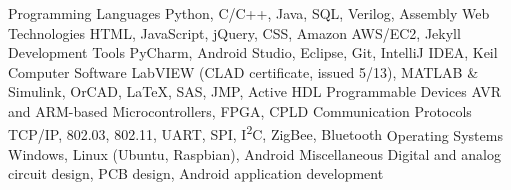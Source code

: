 \begin{cvskills}
  \cvskill
    {Programming Languages}
    {Python, C/C++, Java, SQL, Verilog, Assembly}
  \cvskill
    {Web Technologies}
    {HTML, JavaScript, jQuery, CSS, Amazon AWS/EC2, Jekyll}
  \cvskill
    {Development Tools}
    {PyCharm, Android Studio, Eclipse, Git, IntelliJ IDEA, Keil}
  \cvskill
    {Computer Software}
    {LabVIEW (CLAD certificate, issued 5/13), MATLAB \& Simulink, OrCAD, \LaTeX, SAS, JMP, Active HDL}
  \cvskill
    {Programmable Devices}
    {AVR and ARM-based Microcontrollers, FPGA, CPLD}
  \cvskill
    {Communication Protocols}
    {TCP/IP, 802.03, 802.11, UART, SPI, I\textsuperscript{2}C, ZigBee, Bluetooth}
  \cvskill
    {Operating Systems}
    {Windows, Linux (Ubuntu, Raspbian), Android}
  \cvskill
    {Miscellaneous}
    {Digital and analog circuit design, PCB design, Android application development}
\end{cvskills} 